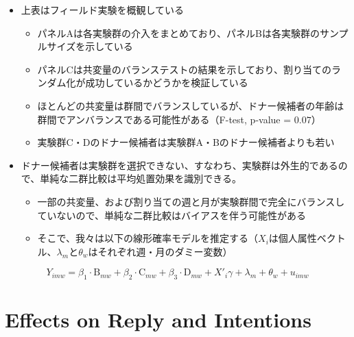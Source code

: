 \documentclass[
  a4paperpaper,
]{article}
\providecommand{\tightlist}{%
  \setlength{\itemsep}{0pt}\setlength{\parskip}{0pt}}\usepackage{longtable,booktabs,array}
\begin{document}
\begin{itemize}
\tightlist
\item
  上表はフィールド実験を概観している

  \begin{itemize}
  \tightlist
  \item
    パネルAは各実験群の介入をまとめており、パネルBは各実験群のサンプルサイズを示している
  \item
    パネルCは共変量のバランステストの結果を示しており、割り当てのランダム化が成功しているかどうかを検証している
  \item
    ほとんどの共変量は群間でバランスしているが、ドナー候補者の年齢は群間でアンバランスである可能性がある（F-test,
    p-value = \(0.07\)）
  \item
    実験群C・Dのドナー候補者は実験群A・Bのドナー候補者よりも若い
  \end{itemize}
\item
  ドナー候補者は実験群を選択できない、すなわち、実験群は外生的であるので、単純な二群比較は平均処置効果を識別できる。

  \begin{itemize}
  \tightlist
  \item
    一部の共変量、および割り当ての週と月が実験群間で完全にバランスしていないので、単純な二群比較はバイアスを伴う可能性がある
  \item
    そこで、我々は以下の線形確率モデルを推定する（\(X_i\)は個人属性ベクトル、\(\lambda_m\)と\(\theta_w\)はそれぞれ週・月のダミー変数）
  \end{itemize}
\end{itemize}

\begin{equation}
  Y_{imw} =
  \beta_1 \cdot \text{B}_{mw} + \beta_2 \cdot \text{C}_{mw}
  + \beta_3 \cdot \text{D}_{mw}
  + X'_i \gamma + \lambda_m + \theta_w + u_{imw}
\end{equation}

\hypertarget{effects-on-reply-and-intentions}{%
\section{Effects on Reply and
Intentions}\label{effects-on-reply-and-intentions}}
\end{document}
